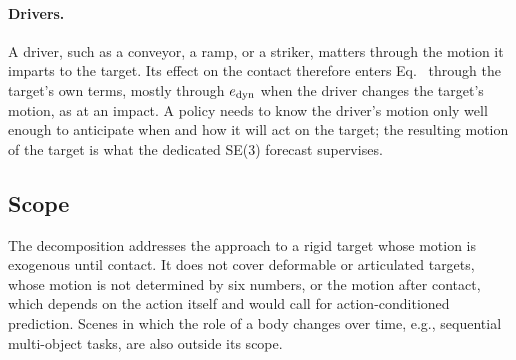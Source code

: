 \paragraph{Drivers.} A driver, such as a conveyor, a ramp, or a striker, matters
through the motion it imparts to the target. Its effect on the contact therefore
enters Eq.~ through the target's own terms, mostly through
$e_{\rm dyn}$ when the driver changes the target's motion, as at an impact. A policy
needs to know the driver's motion only well enough to anticipate when and how it will
act on the target; the resulting motion of the target is what the dedicated SE(3)
forecast supervises.

\subsection{Scope}
\label{app:budget_scope}
The decomposition addresses the approach to a rigid target whose motion is exogenous
until contact. It does not cover deformable or articulated targets, whose motion is
not determined by six numbers, or the motion after contact, which depends on the
action itself and would call for action-conditioned prediction. Scenes in which the
role of a body changes over time, e.g., sequential multi-object tasks, are also
outside its scope.
